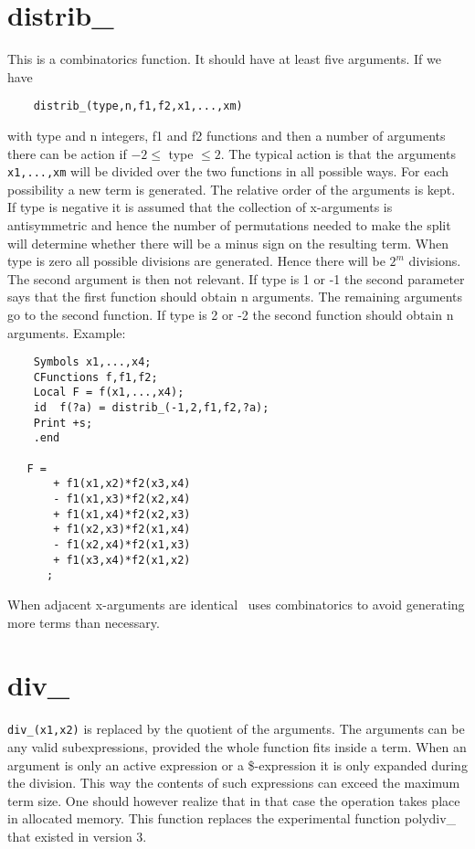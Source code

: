 \section{distrib\_}
\label{fundistrib}
\noindent This is a combinatorics function. It should 
have at least five arguments. If we have
\begin{verbatim}
    distrib_(type,n,f1,f2,x1,...,xm)
\end{verbatim}
with type and n integers, f1 and f2 functions and then a number of 
arguments there can be action if $-2 \le$ type $\le 2$. The typical action 
is that the arguments \verb:x1,...,xm: will be divided over the two 
functions in all possible ways. For each possibility a new term is 
generated. The relative order of the arguments is kept. If type is negative 
it is assumed that the collection of x-arguments is 
antisymmetric and hence the number of permutations 
needed to make the split will determine whether there will be a minus sign 
on the resulting term. When type is zero all possible divisions are 
generated. Hence there will be $2^m$ divisions. The second argument is then 
not relevant. If type is 1 or -1 the second parameter says that the first 
function should obtain n arguments. The remaining arguments go to the 
second function. If type is 2 or -2 the second function should obtain n 
arguments. Example:
\begin{verbatim}
    Symbols x1,...,x4;
    CFunctions f,f1,f2;
    Local F = f(x1,...,x4);
    id  f(?a) = distrib_(-1,2,f1,f2,?a);
    Print +s;
    .end

   F =
       + f1(x1,x2)*f2(x3,x4)
       - f1(x1,x3)*f2(x2,x4)
       + f1(x1,x4)*f2(x2,x3)
       + f1(x2,x3)*f2(x1,x4)
       - f1(x2,x4)*f2(x1,x3)
       + f1(x3,x4)*f2(x1,x2)
      ;
\end{verbatim}
When adjacent x-arguments are identical \FORM\ uses combinatorics to avoid 
generating more terms than necessary.


\section{div\_}
\label{fundiv}
\noindent \verb:div_(x1,x2): is replaced by the quotient of the arguments. 
The arguments can be any valid subexpressions, provided the whole function 
fits inside a term. When an argument is only an active expression or a 
\$-expression it is only expanded during the division. This way the 
contents of such expressions can exceed the maximum term size. One should 
however realize that in that case the operation takes place in allocated 
memory. This function replaces the experimental function 
polydiv\_ that existed in 
version 3.

